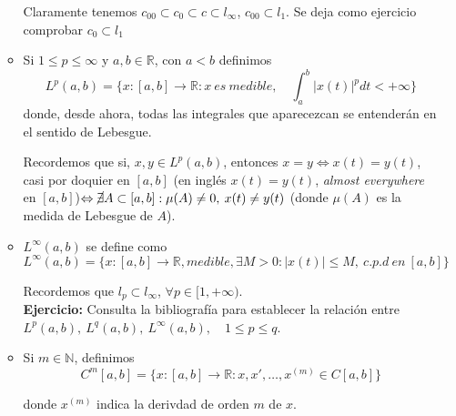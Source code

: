 \documentclass{article}
\begin{document}
\begin{enumerate}
\begin{itemize}
	Claramente tenemos $c_{00}\subset c_0\subset c\subset l_{\infty}$, $c_{00}\subset l_1$. Se deja como ejercicio comprobar $c_0\subset l_1$
	
	\item Si $1\leq p\leq \infty $ y $a,b\in \mathbb{R}$, con $a<b$ definimos
	\begin{equation}
	L^p(a,b)=\{x:[a,b]\rightarrow \mathbb{R}:x\:es\:medible,\quad \int_a^b|x(t)|^p dt<+\infty \}
	\end{equation}
	donde, desde ahora, todas las integrales que aparecezcan se entenderán en el sentido de Lebesgue.
	
	Recordemos que si, $x,y\in L^p(a,b)$, entonces $x=y\Leftrightarrow x(t)=y(t)$, casi por doquier en $[a,b]$ (en inglés $x(t)=y(t)$, \textit{almost everywhere} en $[a,b]$)$\Leftrightarrow \cancel{\exists} A\subset [a,b]:\mu(A)\neq0,\:x(t)\neq y(t)$ (donde $\mu(A)$ es la medida de Lebesgue de $A$).
	
	\item $L^\infty(a,b)$ se define como
	\begin{equation*}
	L^\infty(a,b)=\{x:[a,b]\rightarrow \mathbb{R},medible,\exists M>0:|x(t)|\leq M,\:c.p.d\:en\:[a,b]\}
	\end{equation*}	
	
	Recordemos que $l_p\subset l_\infty$, $\forall p\in [1,+\infty)$.\\
	
	\textbf{Ejercicio:} Consulta la bibliografía para establecer la relación entre $L^p(a,b),\:L^q(a,b),\:L^\infty (a,b),\quad 1\leq p\leq q$.
	
	\item Si $m\in\mathbb{N}$, definimos
	\begin{equation*}
	C^m[a,b]=\{x:[a,b]\rightarrow \mathbb{R}:x,x',\ldots,x^{(m)}\in C[a,b]\}
	\end{equation*}
	
	donde $x^{(m)}$ indica la derivdad de orden $m$ de $x$.
	\end{itemize}
\end{enumerate}
\end{document}
